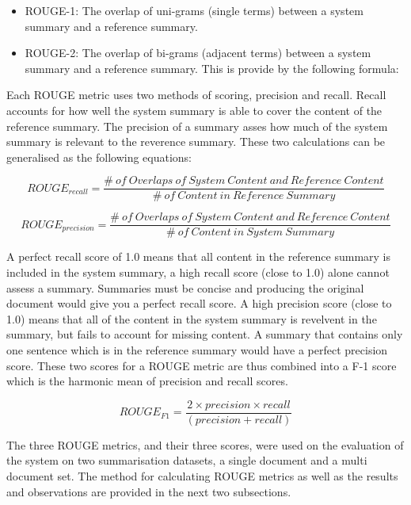 \begin{itemize}
    \item ROUGE-1: The overlap of uni-grams (single terms) between a system summary and a reference summary.
    \item ROUGE-2: The overlap of bi-grams (adjacent terms) between a system summary and a reference summary. This is provide by the following formula:
\end{itemize}

Each ROUGE metric uses two methods of scoring, precision and recall. Recall accounts for how well the system summary is able to cover the content of the reference summary. The precision of a summary asses how much of the system summary is relevant to the reverence summary. These two calculations can be generalised as the following equations:

\begin{equation*}
    ROUGE_{recall} = \frac{\#\:of\: Overlaps\: of \:System\: Content \:and \:Reference\: Content}{\#\: of\: Content\: in\: Reference\: Summary}
    \label{rouge_r2}
\end{equation*}

\begin{equation*}
    ROUGE_{precision} = \frac{\# \:of\: Overlaps\: of\: System\: Content\: and\: Reference\: Content}{\#\: of\: Content\: in\: System\: Summary}
    \label{rouge_p3}
\end{equation*}

A perfect recall score of 1.0 means that all content in the reference summary is included in the system summary, a high recall score (close to 1.0) alone cannot assess a summary. Summaries must be concise and producing the original document would give you a perfect recall score. A high precision score (close to 1.0) means that all of the content in the system summary is revelvent in the summary, but fails to account for missing content. A summary that contains only one sentence which is in the reference summary would have a perfect precision score. These two scores for a ROUGE metric are thus combined into a F-1 score which is the harmonic mean of precision and recall scores.

\begin{equation*}
    ROUGE_{F1} = \frac{2\times precision \times recall}{(precision + recall)}
    \label{rouge_f1}
\end{equation*}

The three ROUGE metrics, and their three scores, were used on the evaluation of the system on two summarisation datasets, a single document and a multi document set. The method for calculating ROUGE metrics as well as the results and observations are provided in the next two subsections.

